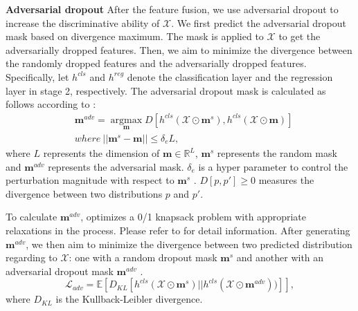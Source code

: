 \documentclass{article}
\begin{document}
\textbf{Adversarial dropout} After the feature fusion, we use adversarial dropout \cite{park2018adversarial, lee2019drop} to increase the discriminative ability of $\mathcal{X}$.
We first predict the adversarial dropout mask based on divergence maximum. The mask is applied to $\mathcal{X}$ to get the adversarially dropped features.
Then, we aim to minimize the divergence between the randomly dropped features and the adversarially dropped features.
Specifically, let $h^{cls}$ and $h^{reg}$ denote the classification layer and the regression layer in stage 2, respectively.
The adversarial dropout mask is calculated as follows according to \cite{lee2019drop}:
\begin{equation}
\begin{split}
    & \mathbf{m}^{adv} = \mathop{\arg\max}\limits_{\mathbf{m}}D[h^{cls}(\mathcal{X} \odot \mathbf{m}^s), h^{cls}(\mathcal{X} \odot \mathbf{m})] \\
    & where~||\mathbf{m}^s - \mathbf{m}|| \leq \delta_e L,
\end{split}
\end{equation}
where $L$ represents the dimension of $\mathbf{m} \in \mathbb R^L$,
$\mathbf{m}^s$ represents the random mask and $\mathbf{m}^{adv}$ represents the adversarial mask.
$\delta_{e}$ is a hyper parameter to control the perturbation magnitude with respect to $\mathbf{m}^{s}$ \cite{lee2019drop}.
$D[p, p']  \geq 0$ measures the divergence between two distributions $p$ and $p'$.

To calculate $\mathbf{m}^{adv}$, \cite{park2018adversarial} optimizes a 0/1 knapsack problem with appropriate relaxations in the process. Please refer to \cite{park2018adversarial} for detail information.
After generating $\mathbf{m}^{adv}$, we then aim to minimize the divergence between two predicted distribution regarding to $\mathcal{X}$: one with a random dropout mask $\mathbf{m}^{s}$ and another with an adversarial dropout mask $\mathbf{m}^{adv}$ \cite{lee2019drop}.
\begin{equation}
    \mathcal{L}_{adv} = \mathbb E[D_{KL}[h^{cls}(\mathcal{X} \odot\mathbf{m}^{s})||h^{cls}(\mathcal{X} \odot\mathbf{m}^{adv}))]],
\end{equation}
where $D_{KL}$ is the Kullback-Leibler divergence.
\end{document}
